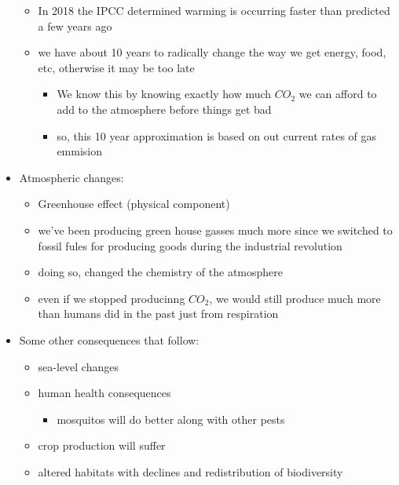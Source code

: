 \documentclass{article}
\theoremstyle{definition}
\begin{document}
\begin{itemize}
\begin{itemize}
			\item In 2018 the IPCC determined warming is occurring faster than predicted a few years ago
			\item we have about 10 years to radically change the way we get energy, food, etc, otherwise it may be too late
				\begin{itemize}
					\item We know this by knowing exactly how much $CO_2$ we can afford to add to the atmosphere before things get bad
					\item so, this 10 year approximation is based on out current rates of gas emmision
				\end{itemize}
		\end{itemize}
	\item Atmospheric changes:
		\begin{itemize}
			\item Greenhouse effect (physical component)
			\item we've been producing green house gasses much more since we switched to fossil fules for producing goods during the industrial revolution
			\item doing so, changed the chemistry of the atmosphere
			\item even if we stopped producinng $CO_2$, we would still produce much more than humans did in the past just from respiration
		\end{itemize}
	\item Some other consequences that follow:
		\begin{itemize}
			\item sea-level changes
			\item human health consequences
				\begin{itemize}
					\item mosquitos will do better along with other pests
				\end{itemize}
			\item crop production will suffer
			\item altered habitats with  declines and redistribution of biodiversity
		\end{itemize}
\end{itemize}


							
\end{document}
